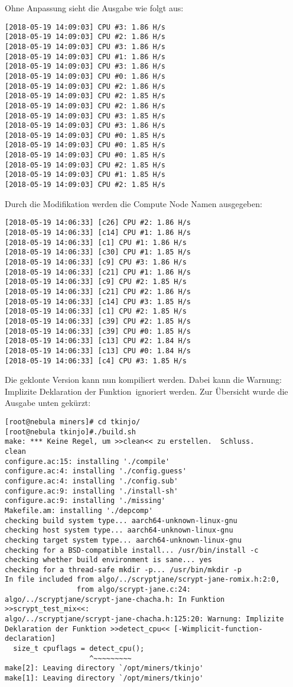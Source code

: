 Ohne Anpassung sieht die Ausgabe wie folgt aus:
\begin{lstlisting}
[2018-05-19 14:09:03] CPU #3: 1.86 H/s
[2018-05-19 14:09:03] CPU #2: 1.86 H/s
[2018-05-19 14:09:03] CPU #3: 1.86 H/s
[2018-05-19 14:09:03] CPU #1: 1.86 H/s
[2018-05-19 14:09:03] CPU #3: 1.86 H/s
[2018-05-19 14:09:03] CPU #0: 1.86 H/s
[2018-05-19 14:09:03] CPU #2: 1.86 H/s
[2018-05-19 14:09:03] CPU #2: 1.85 H/s
[2018-05-19 14:09:03] CPU #2: 1.86 H/s
[2018-05-19 14:09:03] CPU #3: 1.85 H/s
[2018-05-19 14:09:03] CPU #3: 1.86 H/s
[2018-05-19 14:09:03] CPU #0: 1.85 H/s
[2018-05-19 14:09:03] CPU #0: 1.85 H/s
[2018-05-19 14:09:03] CPU #0: 1.85 H/s
[2018-05-19 14:09:03] CPU #2: 1.85 H/s
[2018-05-19 14:09:03] CPU #1: 1.85 H/s
[2018-05-19 14:09:03] CPU #2: 1.85 H/s
\end{lstlisting}
Durch die Modifikation werden die Compute Node Namen ausgegeben:
\begin{lstlisting}
[2018-05-19 14:06:33] [c26] CPU #2: 1.86 H/s
[2018-05-19 14:06:33] [c14] CPU #1: 1.86 H/s
[2018-05-19 14:06:33] [c1] CPU #1: 1.86 H/s
[2018-05-19 14:06:33] [c30] CPU #1: 1.85 H/s
[2018-05-19 14:06:33] [c9] CPU #3: 1.86 H/s
[2018-05-19 14:06:33] [c21] CPU #1: 1.86 H/s
[2018-05-19 14:06:33] [c9] CPU #2: 1.85 H/s
[2018-05-19 14:06:33] [c21] CPU #2: 1.86 H/s
[2018-05-19 14:06:33] [c14] CPU #3: 1.85 H/s
[2018-05-19 14:06:33] [c1] CPU #2: 1.85 H/s
[2018-05-19 14:06:33] [c39] CPU #2: 1.85 H/s
[2018-05-19 14:06:33] [c39] CPU #0: 1.85 H/s
[2018-05-19 14:06:33] [c13] CPU #2: 1.84 H/s
[2018-05-19 14:06:33] [c13] CPU #0: 1.84 H/s
[2018-05-19 14:06:33] [c4] CPU #3: 1.85 H/s
\end{lstlisting}
Die geklonte Version kann nun kompiliert werden. Dabei kann die Warnung: \grqq Implizite Deklaration der Funktion\grqq \ ignoriert werden. Zur Übersicht wurde die Ausgabe unten gekürzt:
\begin{lstlisting}
[root@nebula miners]# cd tkinjo/
[root@nebula tkinjo]#./build.sh
make: *** Keine Regel, um >>clean<< zu erstellen.  Schluss.
clean
configure.ac:15: installing './compile'
configure.ac:4: installing './config.guess'
configure.ac:4: installing './config.sub'
configure.ac:9: installing './install-sh'
configure.ac:9: installing './missing'
Makefile.am: installing './depcomp'
checking build system type... aarch64-unknown-linux-gnu
checking host system type... aarch64-unknown-linux-gnu
checking target system type... aarch64-unknown-linux-gnu
checking for a BSD-compatible install... /usr/bin/install -c
checking whether build environment is sane... yes
checking for a thread-safe mkdir -p... /usr/bin/mkdir -p
In file included from algo/../scryptjane/scrypt-jane-romix.h:2:0,
                 from algo/scrypt-jane.c:24:
algo/../scryptjane/scrypt-jane-chacha.h: In Funktion >>scrypt_test_mix<<:
algo/../scryptjane/scrypt-jane-chacha.h:125:20: Warnung: Implizite Deklaration der Funktion >>detect_cpu<< [-Wimplicit-function-declaration]
  size_t cpuflags = detect_cpu();
                    ^~~~~~~~~~
make[2]: Leaving directory `/opt/miners/tkinjo'
make[1]: Leaving directory `/opt/miners/tkinjo'
\end{lstlisting}
 
